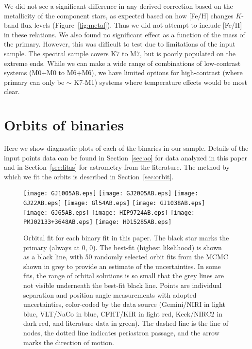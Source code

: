 \documentclass[twocolumn]{aastex62}
\begin{document}
We did not see a significant difference in any derived correction based on the metallicity of the component stars, as expected based on how [Fe/H] changes $K$-band flux levels (Figure~\ref{fig:metal}). Thus we did not attempt to include [Fe/H] in these relations. We also found no significant effect as a function of the mass of the primary. However, this was difficult to test due to limitations of the input sample. The \citet{Mann2015b} spectral sample covers K7 to M7, but is poorly populated on the extreme ends. While we can make a wide range of combinations of low-contrast systems (M0+M0 to M6+M6), we have limited options for high-contrast (where primary can only be $\sim$ K7-M1) systems where temperature effects would be most clear.

\clearpage

\section{Orbits of binaries}\label{sec:orbitplots}

Here we show diagnostic plots of each of the binaries in our sample. Details of the input points data can be found in Section~\ref{sec:ao} for data analyzed in this paper and in Section~\ref{sec:litas} for astrometry from the literature. The method by which we fit the orbits is described in Section~\ref{sec:orbit}.

\begin{figure}[htp]
\begin{center}
\texttt{[image: GJ1005AB.eps]}
\texttt{[image: GJ2005AB.eps]}
\texttt{[image: GJ22AB.eps]}
\texttt{[image: Gl54AB.eps]}
\texttt{[image: GJ1038AB.eps]}
\texttt{[image: GJ65AB.eps]}
\texttt{[image: HIP9724AB.eps]} %
\texttt{[image: PMJ02133+3648AB.eps]} 
\texttt{[image: HD15285AB.eps]} %
\caption{Orbital fit for each binary fit in this paper. The black star marks the primary (always at 0, 0). The best-fit (highest likelihood) is shown as a black line, with 50 randomly selected orbit fits from the MCMC shown in grey to provide an estimate of the uncertainties. In some fits, the range of orbital solutions is so small that the grey lines are not visible underneath the best-fit black line. Points are individual separation and position angle measurements with adopted uncertainties, color-coded by the data source (Gemini/NIRI in light blue, VLT/NaCo in blue, CFHT/KIR in light red, Keck/NIRC2 in dark red, and literature data in green). The dashed line is the line of nodes, the dotted line indicates periastron passage, and the arrow marks the direction of motion. }
\label{fig:orbits1}
\end{center}
\end{figure}
\end{document}
